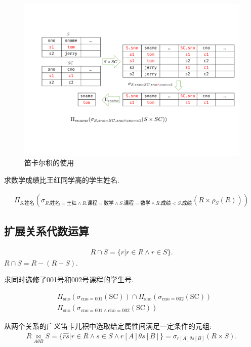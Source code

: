 \begin{figure}[H]
    \centering
    \includegraphics[width=.8\textwidth]{./figure/笛卡尔积的使用.pdf}
    \caption{笛卡尔积的使用}
\end{figure}

\begin{example}
求数学成绩比王红同学高的学生姓名.
\end{example}
\begin{align*}
    \Pi_{S.\text{姓名}}\left(\sigma_{R.\text{姓名}=\text{王红}\land R.\text{课程}=\text{数学}\land S.\text{课程}=\text{数学} \land R.\text{成绩} < S.\text{成绩}} (R\times \rho_S(R))\right)
\end{align*}

\subsection{扩展关系代数运算}

\begin{definition}[交运算]
\begin{align*}
    R\cap S =\{r|r\in R\land r \in S\}.
\end{align*}
$R\cap S = R-(R-S)$.
\end{definition}

\begin{example}
求同时选修了001号和002号课程的学生号.
\end{example}
\begin{align*}
    &\Pi_{\text{sno}}(\sigma_{\text{cno}=001}(\text{SC})) \cap \Pi_{\text{sno}}(\sigma_{\text{cno}=002}(\text{SC})) \\
    &\Pi_{\text{sno}}(\sigma_{\text{cno}=001\land \text{cno}=002}(\text{SC}))
\end{align*}

\begin{definition}[$\theta$连接]
从两个关系的广义笛卡儿积中选取给定属性间满足一定条件的元组:
\begin{align*}
    R \underset{{A\theta B}}{\bowtie} S = \{\widehat{rs}|r\in R \land s \in S \land r[A]\theta s[B]\}
    = \sigma_{r[A]\theta s[B]}(R\times S).
\end{align*}
\end{definition}

